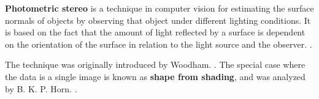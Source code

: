 \documentclass{article}
\begin{document}
\textbf{Photometric stereo} is a technique in computer vision for estimating
the surface normals of objects by observing that object under different
lighting conditions. It is based on the fact that the amount of light reflected
by a surface is dependent on the orientation of the surface in relation
to the light source and the observer. \cite{YingWu15}.

The technique was originally introduced by Woodham. \cite{Woodham92}.
The special case where the data is a single image is known
as \textbf{shape from shading}, and was analyzed by B. K. P. Horn. \cite{Horn89}.

\printbibliography
\end{document}

